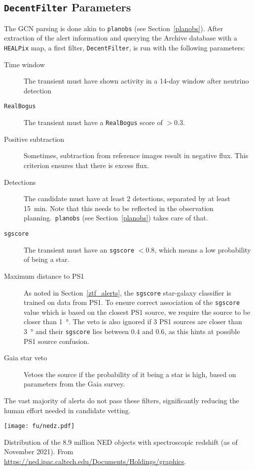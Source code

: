 \subsection{\texttt{DecentFilter} Parameters}
The GCN parsing is done akin to \texttt{planobs} (see Section~\ref{planobs}). After extraction of the alert information and querying the Archive database with a \texttt{HEALPix} map, a first filter, \texttt{DecentFilter}, is run with the following parameters:
\begin{description}
    \item[Time window] The transient must have shown activity in a 14-day window after neutrino detection
    \item[\texttt{RealBogus}] The transient must have a \texttt{RealBogus} score of $>0.3$.
    \item[Positive subtraction] Sometimes, subtraction from reference images result in negative flux. This criterion ensures that there is excess flux.
    \item[Detections] The candidate must have at least 2 detections, separated by at least \SI{15}{\minute}. Note that this needs to be reflected in the observation planning.\ \texttt{planobs} (see Section~\ref{planobs}) takes care of that.
    \item[\texttt{sgscore}] The transient must have an \texttt{sgscore} $<0.8$, which means a low probability of being a star.
    \item[Maximum distance to PS1] As noted in Section~\ref{ztf_alerts}, the \texttt{sgscore} star-galaxy classifier is trained on data from PS1. To ensure correct association of the \texttt{sgscore} value which is based on the closest PS1 source, we require the source to be closer than \SI{1}{\degree}. The veto is also ignored if 3 PS1 sources are closer than \SI{3}{\degree} and their \texttt{sgscore} lies between $0.4$ and $0.6$, as this hints at possible PS1 source confusion.
    \item[Gaia star veto] Vetoes the source if the probability of it being a star is high, based on parameters from the Gaia survey.
\end{description}
The vast majority of alerts do not pass these filters, significantly reducing the human effort needed in candidate vetting.
\begin{marginfigure}
    \texttt{[image: fu/nedz.pdf]}
    \caption[NED spectroscopic redshift distribution]{Distribution of the 8.9 million NED objects with spectroscopic redshift (as of November 2021). From \url{https://ned.ipac.caltech.edu/Documents/Holdings/graphics}.}
\end{marginfigure}
